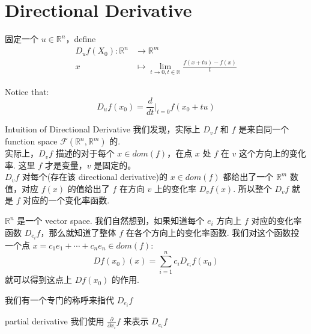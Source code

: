 \documentclass[lang=cn,11pt]{elegantbook}
\begin{document}
\section{Directional Derivative}
\begin{definition}
    固定一个 $u \in \mathbb{R}^n$，define 
    \begin{align}
        D_u f(X_0) : \mathbb{R}^n & \rightarrow \mathbb{R}^m\\
        x & \mapsto \lim_{t\rightarrow 0, t\in \mathbb{R}} \frac{f(x + tu) - f(x)}{t}
    \end{align}

        Notice that:
        $$
        D_u f(x_0) = \frac{d}{dt}\bigg| _{t=0} f(x_0 + tu)
        $$
\end{definition}


\begin{proposition}{Intuition of Directional Derivative}
我们发现，实际上 $D_v f$ 和 $f$ 是来自同一个 function space $\mathcal{F}(\mathbb{R}^n, \mathbb{R}^m)$ 的.\\
实际上，$D_v f$ 描述的对于每个 $x \in dom(f)$，在点 $x$ 处 $f$ 在 $v$ 这个方向上的变化率. 这里 $f$ 才是变量，$v$ 是固定的。\\
$D_v f$ 对每个(存在该 directional derivative)的 $x \in dom(f)$ 都给出了一个 $\mathbb{R}^m$ 数值，对应 $f(x)$ 的值给出了 $f$ 在方向 $v$ 上的变化率 $D_v f(x)$. 所以整个 $D_v f$ 就是 $f$ 对应的一个变化率函数.
\end{proposition}

\begin{remark}
    $\mathbb{R}^n$ 是一个 vector space. 我们自然想到，如果知道每个 $e_i$ 方向上 $f$ 对应的变化率函数 $D_{e_i} f$，那么就知道了整体 $f$ 在各个方向上的变化率函数. 我们对这个函数投一个点 $x = c_1 e_1 + \cdots + c_n e_n \in dom(f)$:
    $$
    Df(x_0)(x) = \sum_{i=1}^n c_i D_{e_i} f(x_0) 
    $$
    就可以得到这点上 $Df(x_0)$ 的作用.
\end{remark}

\noindent 我们有一个专门的称呼来指代 $D_{e_i} f$
\begin{definition}{partial derivative} \label{partial derivative}
    我们使用 $\frac{\partial }{ \partial x_i} f$ 来表示 $D_{e_i} f$
\end{definition}
\end{document}
